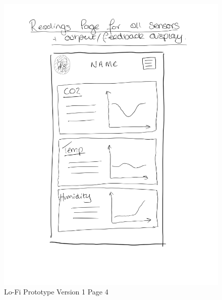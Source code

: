 \documentclass{ueacmpstyle}
\begin{document}
            \begin{figure}[h]
                
                \includegraphics[width=\linewidth]{Images/Lofi_v1_d.jpg}
                \caption{Lo-Fi Prototype Version 1 Page 4}
                \label{Figure Lofi v1 4}
                
            \end{figure}
            \clearpage
\end{document}
